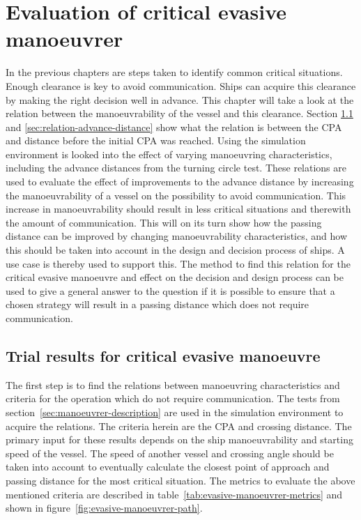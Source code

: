 \chapter{Evaluation of critical evasive manoeuvrer}
In the previous chapters are steps taken to identify common critical situations. Enough clearance is key to avoid communication. Ships can acquire this clearance by making the right decision well in advance. This chapter will take a look at the relation between the manoeuvrability of the vessel and this clearance. Section \ref{sec:trial-result} and \ref{sec:relation-advance-distance} show what the relation is between the CPA and distance before the initial CPA was reached. Using the simulation environment is looked into the effect of varying manoeuvring characteristics, including the advance distances from the turning circle test.
These relations are used to evaluate the effect of improvements to the advance distance by increasing the manoeuvrability of a vessel on the possibility to avoid communication. This increase in manoeuvrability should result in less critical situations and therewith the amount of communication. This will on its turn show how the passing distance can be improved by changing manoeuvrability characteristics, and how this should be taken into account in the design and decision process of ships. A use case is thereby used to support this.
The method to find this relation for the critical evasive manoeuvre and effect on the decision and design process can be used to give a general answer to the question if it is possible to ensure that a chosen strategy will result in a passing distance which does not require communication.

\section{Trial results for critical evasive manoeuvre}
\label{sec:trial-result}
The first step is to find the relations between manoeuvring characteristics and criteria for the operation which do not require communication. The tests from section~\ref{sec:manoeuvrer-description} are used in the simulation environment to acquire the relations. The criteria herein are the \ac{CPA} and crossing distance. The primary input for these results depends on the ship manoeuvrability and starting speed of the vessel. The speed of another vessel and crossing angle should be taken into account to eventually calculate the closest point of approach and passing distance for the most critical situation. The metrics to evaluate the above mentioned criteria are described in table~\ref{tab:evasive-manoeuvrer-metrics} and shown in figure~\ref{fig:evasive-manoeuvrer-path}.


